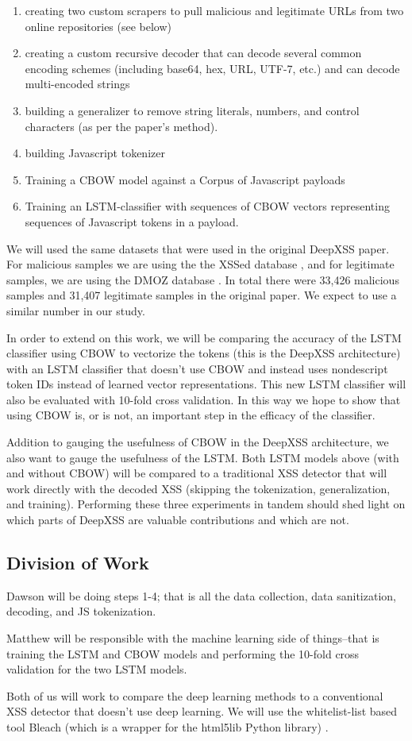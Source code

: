 \documentclass{llncs}
\begin{document}
\begin{enumerate}
    \item creating two custom scrapers to pull malicious and legitimate URLs from two online repositories (see below)
    \item creating a custom recursive decoder that can decode several common encoding schemes (including base64, hex, URL, UTF-7, etc.) and can decode multi-encoded strings 
    \item building a generalizer to remove string literals, numbers, and control characters (as per the paper's method).
    \item building Javascript tokenizer
    \item Training a CBOW model against a Corpus of Javascript payloads
    \item Training an LSTM-classifier with sequences of CBOW vectors representing sequences of Javascript tokens in a payload.
\end{enumerate}

We will used the same datasets that were used in the original DeepXSS paper. For malicious samples we are using the the XSSed database \cite{xssed}, and for legitimate samples, we are using the DMOZ database \cite{dmoz}. In total there were 33,426 malicious samples and 31,407 legitimate samples in the original paper. We expect to use a similar number in our study.

In order to extend on this work, we will be comparing the accuracy of the LSTM classifier using CBOW to vectorize the tokens (this is the DeepXSS architecture) with an LSTM classifier that doesn't use CBOW and instead uses nondescript token IDs instead of learned vector representations. This new LSTM classifier will also be evaluated with 10-fold cross validation. In this way we hope to show that using CBOW is, or is not, an important step in the efficacy of the classifier. 

Addition to gauging the usefulness of CBOW in the DeepXSS architecture, we also want to gauge the usefulness of the LSTM. Both LSTM models above (with and without CBOW) will be compared to a traditional XSS detector that will work directly with the decoded XSS (skipping the tokenization, generalization, and training). Performing these three experiments in tandem should shed light on which parts of DeepXSS are valuable contributions and which are not. 

\subsection{Division of Work}
Dawson will be doing steps 1-4; that is all the data collection, data sanitization, decoding, and JS tokenization. 

Matthew will be responsible with the machine learning side of things--that is training the LSTM and CBOW models and performing the 10-fold cross validation for the two LSTM models.

Both of us will work to compare the deep learning methods to a conventional XSS detector that doesn't use deep learning. We will use the whitelist-list based tool Bleach (which is a wrapper for the html5lib Python library)  \cite{bleach}.


\newpage


\end{document}
